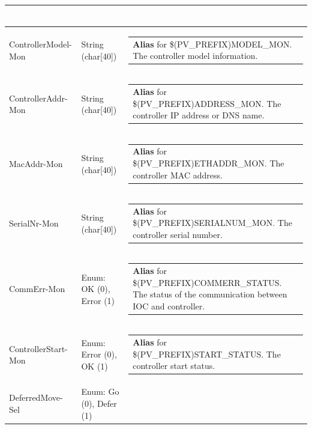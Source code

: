 \documentclass[openany]{article}
\begin{document}
\begin{longtable}{| m{4.5cm} m{2.5cm}  m{8.5cm} |}
\begin{tabular}{@{}m{6cm}@{}}
            \end{tabular} \hypertarget{pv:controller-model-mon}{}\\ \hline
        ControllerModel-Mon & String (char[40]) & \begin{tabular}{@{}m{6cm}@{}}
                \textbf{\color{blue} Alias} for \$(PV\_PREFIX)MODEL\_MON. The controller model information.
            \end{tabular} \hypertarget{pv:controller-addr-mon}{}\\ \hline
        ControllerAddr-Mon & String (char[40]) & \begin{tabular}{@{}m{6cm}@{}}
                \textbf{\color{blue} Alias} for \$(PV\_PREFIX)ADDRESS\_MON. The controller IP address or DNS name.
            \end{tabular} \hypertarget{pv:mac-addr-mon}{}\\ \hline
        MacAddr-Mon & String (char[40]) & \begin{tabular}{@{}m{6cm}@{}}
                \textbf{\color{blue} Alias} for \$(PV\_PREFIX)ETHADDR\_MON. The controller MAC address.
            \end{tabular} \hypertarget{pv:serial-nr-mon}{}\\ \hline
        SerialNr-Mon & String (char[40]) & \begin{tabular}{@{}m{6cm}@{}}
                \textbf{\color{blue} Alias} for \$(PV\_PREFIX)SERIALNUM\_MON. The controller serial number.
            \end{tabular} \hypertarget{pv:comm-err-mon}{}\\ \hline
        CommErr-Mon & Enum: OK (0), Error (1) & \begin{tabular}{@{}m{6cm}@{}}
                \textbf{\color{blue} Alias} for \$(PV\_PREFIX)COMMERR\_STATUS. The status of the communication between IOC and controller.
            \end{tabular} \hypertarget{pv:controller-start-mon}{}\\ \hline
        ControllerStart-Mon & Enum: Error (0), OK (1)  & \begin{tabular}{@{}m{6cm}@{}}
                \textbf{\color{blue} Alias} for \$(PV\_PREFIX)START\_STATUS. The controller start status.
            \end{tabular} \hypertarget{pv:deferred-move}{}\\ \hline
        DeferredMove-Sel & Enum: Go (0), Defer (1) & \begin{tabular}{@{}m{6cm}@{}}

\end{tabular}
\end{longtable}
\end{document}
